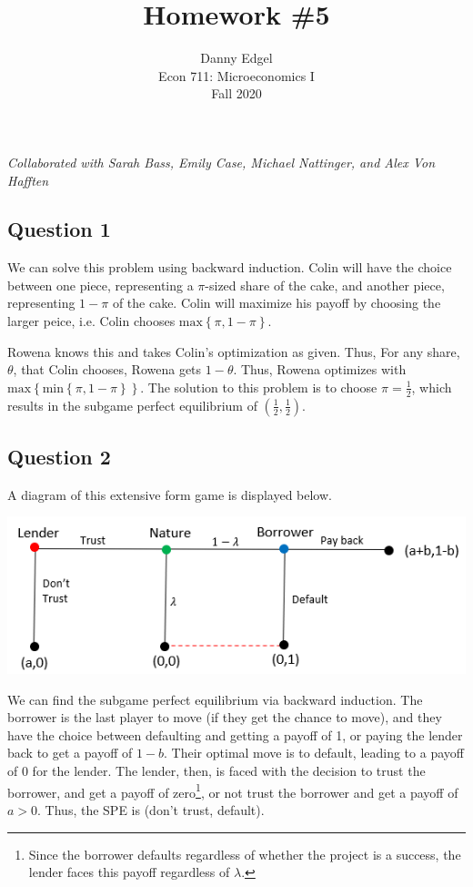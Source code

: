 \documentclass{article}
\begin{document}
\title{	Homework \#5 }
\author{ 	Danny Edgel 					\\ 
			Econ 711: Microeconomics I		\\
			Fall 2020						\\
		}
\maketitle\thispagestyle{empty}

\noindent\textit{Collaborated with Sarah Bass, Emily Case, Michael Nattinger, and Alex Von Hafften}


\subsection*{Question 1}
We can solve this problem using backward induction. Colin will have the choice between one piece, representing a $\pi$-sized share of the cake, and another piece, representing $1-\pi$ of the cake. Colin will maximize his payoff by choosing the larger peice, i.e. Colin chooses ${\text{max}\left\{\pi,1-\pi\right\}}$.

Rowena knows this and takes Colin's optimization as given. Thus, For any share, $\theta$, that Colin chooses, Rowena gets ${1-\theta}$. Thus, Rowena optimizes with ${\text{max}\left\{\text{min}\left\{\pi,1-\pi\right\}\right\}}$. The solution to this problem is to choose ${\pi=\frac{1}{2}}$, which results in the subgame perfect equilibrium of ${\left(\frac{1}{2},\frac{1}{2}\right)}$.



\subsection*{Question 2}
A diagram of this extensive form game is displayed below. 
\begin{center}
	\includegraphics[scale=.8]{figure1.png}
\end{center}
We can find the subgame perfect equilibrium via backward induction. The borrower is the last player to move (if they get the chance to move), and they have the choice between defaulting and getting a payoff of 1, or paying the lender back to get a payoff of ${1-b}$. Their optimal move is to default, leading to a payoff of 0 for the lender. The lender, then, is faced with the decision to trust the borrower, and get a payoff of zero\footnote{Since the borrower defaults regardless of whether the project is a success, the lender faces this payoff regardless of $\lambda$.}, or not trust the borrower and get a payoff of $a>0$. Thus, the SPE is (don't trust, default).
\end{document}

